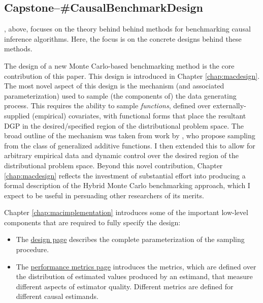 \documentclass[../main.tex]{subfiles}
\begin{document}
\subsection*{\textbf{Capstone--\#CausalBenchmarkDesign}}
\label{lo:CausalBenchmarkDesign}

, above, focuses on the theory behind behind methods for benchmarking causal inference algorithms. Here, the focus is on the concrete designs behind these methods.

\vspace{\baselineskip}

The design of a new Monte Carlo-based benchmarking method is the core contribution of this paper. This design is introduced in Chapter \ref{chap:macdesign}. The most novel aspect of this design is the mechanism (and associated parameterization) used to sample (the components of) the data generating process. This requires the ability to sample \textit{functions}, defined over externally-supplied (empirical) covariates, with functional forms that place the resultant DGP in the desired/specified region of the distributional problem space. The broad outline of the mechanism was taken from work by \textcite{Dorie2019Automated1}, who propose sampling from the class of generalized additive functions. I then extended this to allow for arbitrary empirical data and dynamic control over the desired region of the distributional problem space. Beyond this novel contribution, Chapter \ref{chap:macdesign} reflects the investment of substantial effort into producing a formal description of the Hybrid Monte Carlo benchmarking approach, which I expect to be useful in persuading other researchers of its merits.

\vspace{\baselineskip}

Chapter \ref{chap:macimplementation} introduces some of the important low-level components that are required to fully specify the design:

\begin{itemize}

    \item The \href{\RTDurl/design.html}{design page} describes the complete parameterization of the sampling procedure.
    
    \item The \href{\RTDurl/reference/modeling/performance-metrics.html}{performance metrics page} introduces the metrics, which are defined over the distribution of estimated values produced by an estimand, that measure different aspects of estimator quality. Different metrics are defined for different causal estimands.
    
\end{itemize}
\end{document}
